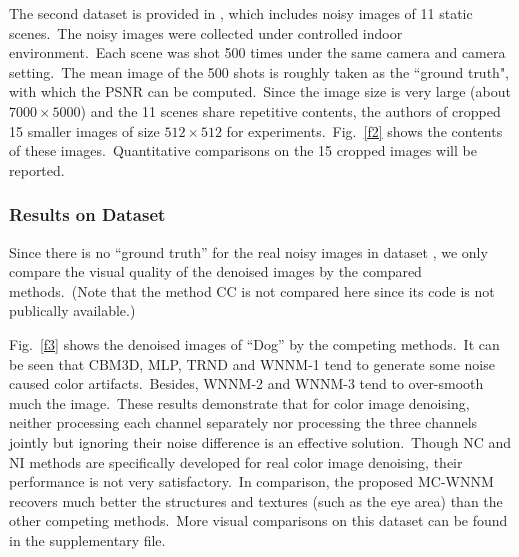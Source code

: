 The second dataset is provided in \cite{crosschannel2016}, which includes noisy images of 11 static scenes.\ The noisy images were collected under controlled indoor environment.\ Each scene was shot 500 times under the same camera and camera setting.\ The mean image of the 500 shots is roughly taken as the ``ground truth", with which the PSNR can be computed.\ Since the image size is very large (about $7000\times5000$) and the 11 scenes share repetitive contents, the authors of \cite{crosschannel2016} cropped 15 smaller images of size $512\times512$ for experiments.\ Fig.\ \ref{f2} shows the contents of these images.\ Quantitative comparisons on the 15 cropped images will be reported. 

\subsubsection{Results on Dataset \cite{ncwebsite}}

\quad Since there is no ``ground truth'' for the real noisy images in dataset \cite{ncwebsite}, we only compare the visual quality of the denoised images by the compared methods.\ (Note that the method CC \cite{crosschannel2016} is not compared here since its code is not publically available.)

Fig.\ \ref{f3} shows the denoised images of ``Dog'' by the competing methods.\ It can be seen that CBM3D, MLP, TRND and WNNM-1 tend to generate some noise caused color artifacts.\ Besides, WNNM-2 and WNNM-3 tend to over-smooth much the image.\ These results demonstrate that for color image denoising, neither processing each channel separately nor processing the three channels jointly but ignoring their noise difference is an effective solution.\ Though NC and NI methods are specifically developed for real color image denoising, their performance is not very satisfactory.\ In comparison, the proposed MC-WNNM recovers much better the structures and textures (such as the eye area) than the other competing methods.\ More visual comparisons on this dataset can be found in the supplementary file.



